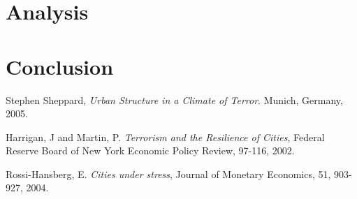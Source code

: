 \documentclass[preprint,2p,12pt]{elsarticle}
\begin{document}
\section{Analysis}


\section{Conclusion}


\begin{thebibliography}{9}

  Stephen Sheppard,
  \emph{Urban Structure in a Climate of Terror}.
  Munich, Germany,
  2005.

  Harrigan, J and Martin, P.
  \emph{Terrorism and the Resilience of Cities},
  Federal Reserve Board of New York Economic Policy Review,
  97-116,
  2002.

  Rossi-Hansberg, E.
  \emph{Cities under stress},
  Journal of Monetary Economics,
  51, 903-927,
  2004.

\end{thebibliography}
\end{document}
